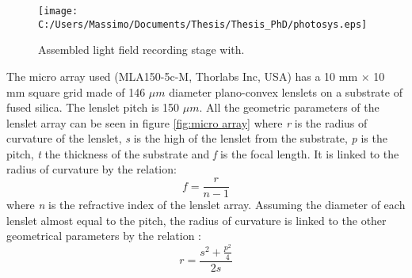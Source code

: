 \begin{figure}[H]
	\centering
	\texttt{[image: C:/Users/Massimo/Documents/Thesis/Thesis\_PhD/photosys.eps]}
	\caption{\label{fig:photo} Assembled light field recording stage with. }
\end{figure}
The micro array used (MLA150-5c-M, Thorlabs Inc, USA) has a 10 mm $\times$ 10 mm square grid made of 146 $\mu m$ diameter plano-convex lenslets on a substrate of fused silica. The lenslet pitch is 150 $\mu m$. All the geometric parameters of the lenslet array can be seen in figure \ref{fig:micro array} where \textit{r} is the radius of curvature of the lenslet, \textit{s} is the high of the lenslet from the substrate, \textit{p} is the pitch, \textit{t} the thickness of the substrate and \textit{f} is the focal length. It is linked to the radius of curvature by the relation:
\begin{equation}
	\label{eq:f_micro}
		f = \dfrac{r}{n-1}
\end{equation} 
where \textit{n} is the refractive index of the lenslet array.
Assuming the diameter of each lenslet almost equal to the pitch, the radius of curvature is linked to the other geometrical parameters by the relation \cite{herzig1997micro}: 
\begin{equation}
\label{eq:r_micro}
r = \dfrac{s^2+\frac{p^2}{4}}{2s}
\end{equation} 

